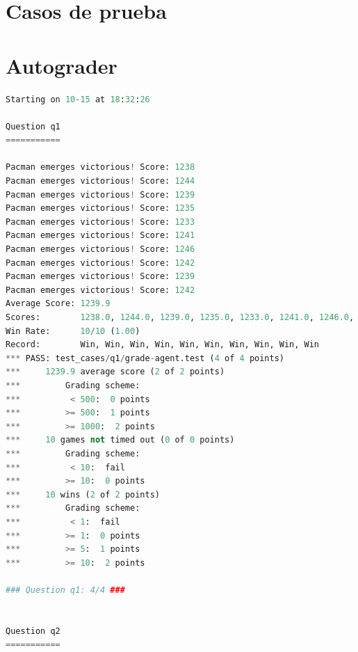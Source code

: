 \documentclass{report}
\begin{document}
      \section{Casos de prueba}
      \clearpage\section{Autograder}
        \begin{lstlisting}[language=Python, caption=Resultados del Autograder]
Starting on 10-15 at 18:32:26

Question q1
===========

Pacman emerges victorious! Score: 1238
Pacman emerges victorious! Score: 1244
Pacman emerges victorious! Score: 1239
Pacman emerges victorious! Score: 1235
Pacman emerges victorious! Score: 1233
Pacman emerges victorious! Score: 1241
Pacman emerges victorious! Score: 1246
Pacman emerges victorious! Score: 1242
Pacman emerges victorious! Score: 1239
Pacman emerges victorious! Score: 1242
Average Score: 1239.9
Scores:        1238.0, 1244.0, 1239.0, 1235.0, 1233.0, 1241.0, 1246.0, 1242.0, 1239.0, 1242.0
Win Rate:      10/10 (1.00)
Record:        Win, Win, Win, Win, Win, Win, Win, Win, Win, Win
*** PASS: test_cases/q1/grade-agent.test (4 of 4 points)
***     1239.9 average score (2 of 2 points)
***         Grading scheme:
***          < 500:  0 points
***         >= 500:  1 points
***         >= 1000:  2 points
***     10 games not timed out (0 of 0 points)
***         Grading scheme:
***          < 10:  fail
***         >= 10:  0 points
***     10 wins (2 of 2 points)
***         Grading scheme:
***          < 1:  fail
***         >= 1:  0 points
***         >= 5:  1 points
***         >= 10:  2 points

### Question q1: 4/4 ###


Question q2
===========


\end{lstlisting}
\end{document}
